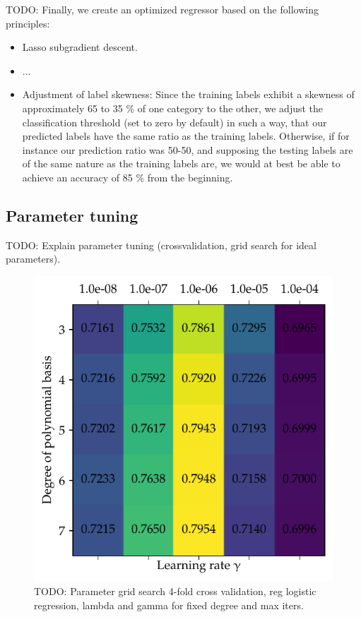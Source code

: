 \documentclass[11pt, a4paper, twocolumn]{article}
\begin{document}
{\color{red}TODO}: Finally, we create an optimized regressor based on the following principles:

\begin{itemize}
    \item Lasso subgradient descent.
    \item ...
    \item Adjustment of label skewness: Since the training labels exhibit a skewness
          of approximately 65 to 35 \% of one category to the other, we adjust the
          classification threshold (set to zero by default) in such a way, that our
          predicted labels have the same ratio as the training labels. Otherwise,
          if for instance our prediction ratio was 50-50, and supposing the testing
          labels are of the same nature as the training labels are, we would at best
          be able to achieve an accuracy of 85 \% from the beginning.
\end{itemize}

\subsection{Parameter tuning}
\label{subsec:tuning}

{\color{red}TODO}: Explain parameter tuning (crossvalidation, grid search for ideal parameters).

\begin{figure}[htp]
    \centering
    \includegraphics[width=\columnwidth]{figures/log_reg_gridsearch.pdf}
    \caption{{\color{red}TODO}: Parameter grid search 4-fold cross validation, reg logistic regression, lambda and gamma for fixed degree and max iters.}
    \label{fig:paramter_grid_search}
\end{figure}
\end{document}
